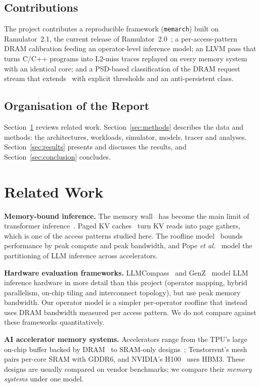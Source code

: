 \documentclass[12pt]{article}
\begin{document}
\subsection{Contributions}
The project contributes a reproducible framework (\texttt{memarch}) built on Ramulator~2.1, the current release of Ramulator~2.0~\cite{luo2024}; a per-access-pattern DRAM calibration feeding an operator-level inference model; an LLVM pass that turns C/C++ programs into L2-miss traces replayed on every memory system with an identical core; and a PSD-based classification of the DRAM request stream that extends~\cite{agarwal2025} with explicit thresholds and an anti-persistent class.

\subsection{Organisation of the Report}
Section~\ref{sec:related} reviews related work. Section~\ref{sec:methods} describes the data and methods: the architectures, workloads, simulator, models, tracer and analyses. Section~\ref{sec:results} presents and discusses the results, and Section~\ref{sec:conclusion} concludes.
\newpage

\section{Related Work}\label{sec:related}
\textbf{Memory-bound inference.} The memory wall~\cite{wulf1995} has become the main limit of transformer inference~\cite{gholami2024}. Paged KV caches~\cite{kwon2023} turn KV reads into page gathers, which is one of the access patterns studied here. The roofline model~\cite{williams2009} bounds performance by peak compute and peak bandwidth, and Pope \emph{et al.}~\cite{pope2023} model the partitioning of LLM inference across accelerators.

\textbf{Hardware evaluation frameworks.} LLMCompass~\cite{zhang2024} and GenZ~\cite{bambhaniya2024} model LLM inference hardware in more detail than this project (operator mapping, hybrid parallelism, on-chip tiling and interconnect topology), but use peak memory bandwidth. Our operator model is a simpler per-operator roofline that instead uses DRAM bandwidth measured per access pattern. We do not compare against these frameworks quantitatively.

\textbf{AI accelerator memory systems.} Accelerators range from the TPU's large on-chip buffer backed by DRAM~\cite{jouppi2017} to SRAM-only designs~\cite{abts2020,lie2023}; Tenstorrent's mesh~\cite{vasiljevic2021} pairs per-core SRAM with GDDR6, and NVIDIA's H100~\cite{choquette2023} uses HBM3. These designs are usually compared on vendor benchmarks; we compare their \emph{memory systems} under one model.
\end{document}
